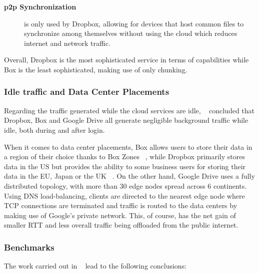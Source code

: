 \begin{description}
	\item[\textbf{\ac{p2p} Synchronization}] is only used by Dropbox, allowing for devices that host common files to synchronize among themselves without using the cloud which reduces internet and network traffic.
\end{description}

Overall, Dropbox is the most sophisticated service in terms of capabilities while Box is the least sophisticated, making use of only chunking.

\subsubsection{Idle traffic and Data Center Placements}
Regarding the traffic generated while the cloud services are idle, ~\cite{personal1} concluded that Dropbox, Box and Google Drive all generate negligible background traffic while idle, both during and after login. 

When it comes to data center placements, Box allows users to store their data in a region of their choice thanks to Box Zones ~\cite{box}, while Dropbox primarily stores data in the US but provides the ability to some business users for storing their data in the EU, Japan or the UK ~\cite{dropbox_data_centers}. On the other hand, Google Drive uses a fully distributed topology, with more than 30 edge nodes spread across 6 continents. Using DNS load-balancing, clients are directed to the nearest edge node where TCP connections are terminated and traffic is routed to the data centers by making use of Google's private network. This, of course, has the net gain of smaller RTT and less overall traffic being offloaded from the public internet.

\subsubsection{Benchmarks}

The work carried out in ~\cite{personal1} lead to the following conclusions:

